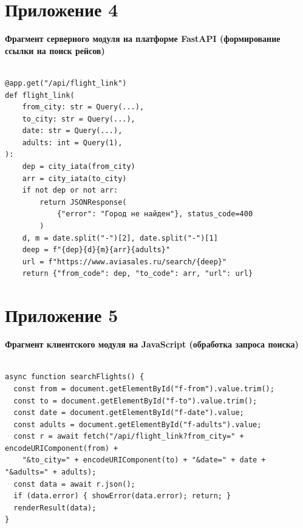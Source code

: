 \documentclass[14pt,a4paper,oneside]{extreport}
\begin{document}

\section*{Приложение 4}

\par\noindent\textbf{Фрагмент серверного модуля на платформе FastAPI (формирование ссылки на поиск рейсов)}\par\vspace{4pt}

\begin{Verbatim}[fontsize=\small,frame=single,xleftmargin=6pt]

@app.get("/api/flight_link")
def flight_link(
    from_city: str = Query(...),
    to_city: str = Query(...),
    date: str = Query(...),
    adults: int = Query(1),
):
    dep = city_iata(from_city)
    arr = city_iata(to_city)
    if not dep or not arr:
        return JSONResponse(
            {"error": "Город не найден"}, status_code=400
        )
    d, m = date.split("-")[2], date.split("-")[1]
    deep = f"{dep}{d}{m}{arr}{adults}"
    url = f"https://www.aviasales.ru/search/{deep}"
    return {"from_code": dep, "to_code": arr, "url": url}

\end{Verbatim}


\section*{Приложение 5}

\par\noindent\textbf{Фрагмент клиентского модуля на JavaScript (обработка запроса поиска)}\par\vspace{4pt}

\begin{Verbatim}[fontsize=\small,frame=single,xleftmargin=6pt]

async function searchFlights() {
  const from = document.getElementById("f-from").value.trim();
  const to = document.getElementById("f-to").value.trim();
  const date = document.getElementById("f-date").value;
  const adults = document.getElementById("f-adults").value;
  const r = await fetch("/api/flight_link?from_city=" + encodeURIComponent(from) +
    "&to_city=" + encodeURIComponent(to) + "&date=" + date + "&adults=" + adults);
  const data = await r.json();
  if (data.error) { showError(data.error); return; }
  renderResult(data);
}

\end{Verbatim}
\end{document}
